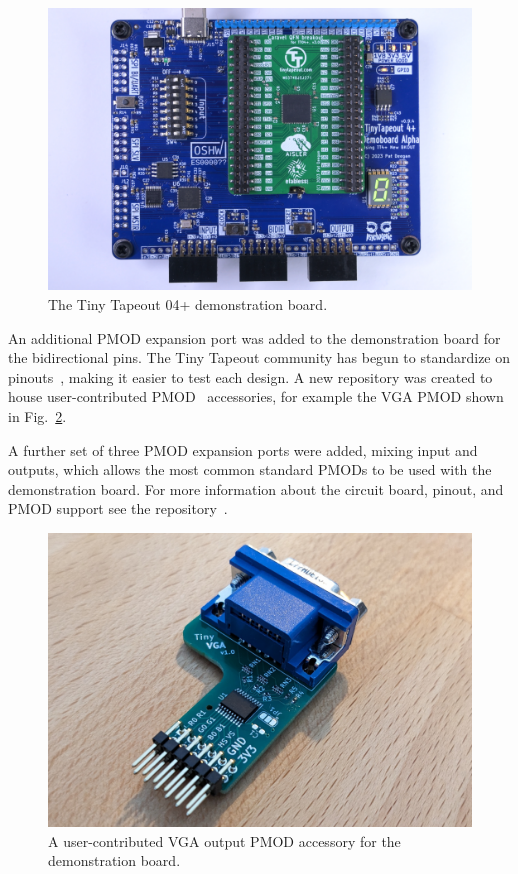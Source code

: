 \begin{figure}[!t]
\centering
\includegraphics[width=\columnwidth]{./Figs/tt04-demoboard-top.jpg}
\caption{The Tiny Tapeout 04+ demonstration board\cite{tt04demoboard}.}
\label{fig:TT04plus_demo_board}
\end{figure}

An additional PMOD expansion port was added to the demonstration board for the bidirectional pins. The Tiny Tapeout community has begun to standardize on pinouts~\cite{pinouts}, making it easier to test each design.
A new repository was created to house user-contributed PMOD~\cite{awesomepmods} accessories, for example the VGA PMOD shown in Fig.~\ref{fig:user_contributed_VGA_PMOD}.

A further set of three PMOD expansion ports were added, mixing input and outputs, which allows the most common standard PMODs to be used with the demonstration board. For more information about the circuit board, pinout, and PMOD support see the repository~\cite{tt04demoboard}.

\begin{figure}[!t]
\centering
\includegraphics[width=\columnwidth]{./Figs/tiny_vga_pmod.jpg}
\caption{A user-contributed VGA output PMOD accessory for the demonstration board.}
\label{fig:user_contributed_VGA_PMOD}
\end{figure}
